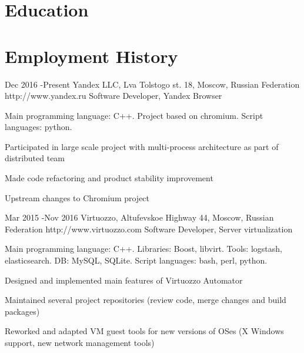 \documentclass[10pt]{article} %
\begin{document}
\section{Education}



\section{Employment History}

\job
{Dec 2016 -}{Present}
{Yandex LLC, Lva Tolstogo st. 18, Moscow, Russian Federation}
{http://www.yandex.ru}
{Software Developer, Yandex Browser}
{
Main programming language: C++. Project based on chromium. Script languages: python.
\begin{itemize-noindent}
\setlength\itemsep{0em}
\item{Participated in large scale project with multi-process architecture as part of distributed team}
\item{Made code refactoring and product stability improvement}
\item{Upstream changes to Chromium project}
\end{itemize-noindent}
}


\job
{Mar 2015 -}{Nov 2016}
{Virtuozzo, Altufevskoe Highway 44, Moscow, Russian Federation}
{http://www.virtuozzo.com}
{Software Developer, Server virtualization}
{
Main programming language: C++. Libraries: Boost, libvirt. Tools: logstash, elasticsearch. DB: MySQL, SQLite. Script languages: bash, perl, python.
\begin{itemize-noindent}
\setlength\itemsep{0em}
\item{Designed and implemented main features of Virtuozzo Automator}
\item{Maintained several project repositories (review code, merge changes and build packages)}
\item{Reworked and adapted VM guest tools for new versions of OSes (X Windows support, new network management tools)}
\end{itemize-noindent}
}
\end{document}
